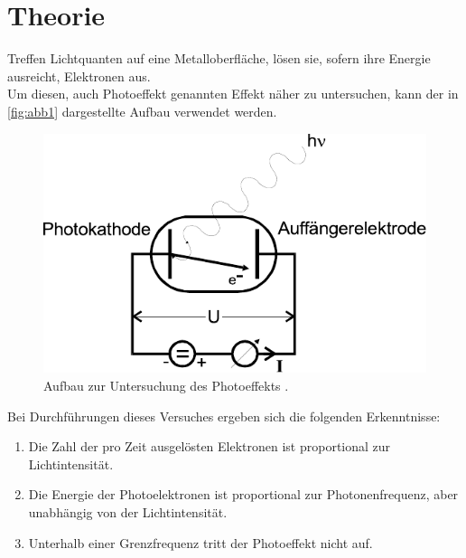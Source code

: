 \section{Theorie}
\label{sec:theorie}

Treffen Lichtquanten auf eine Metalloberfläche,
lösen sie, sofern ihre Energie ausreicht, Elektronen aus. \\

Um diesen, auch Photoeffekt genannten Effekt näher zu untersuchen,
kann der in \autoref{fig:abb1} dargestellte Aufbau verwendet werden.

\begin{figure}
    \centering
    \includegraphics{figures/Abb1.pdf}
    \caption{Aufbau zur Untersuchung des Photoeffekts \cite{ap10}.}
    \label{fig:abb1}
\end{figure}

Bei Durchführungen dieses Versuches ergeben sich die folgenden Erkenntnisse:

\begin{enumerate}
    \item Die Zahl der pro Zeit ausgelösten Elektronen ist proportional zur Lichtintensität.
    \item Die Energie der Photoelektronen ist proportional zur Photonenfrequenz, aber unabhängig von der Lichtintensität.
    \item Unterhalb einer Grenzfrequenz tritt der Photoeffekt nicht auf.
\end{enumerate}
